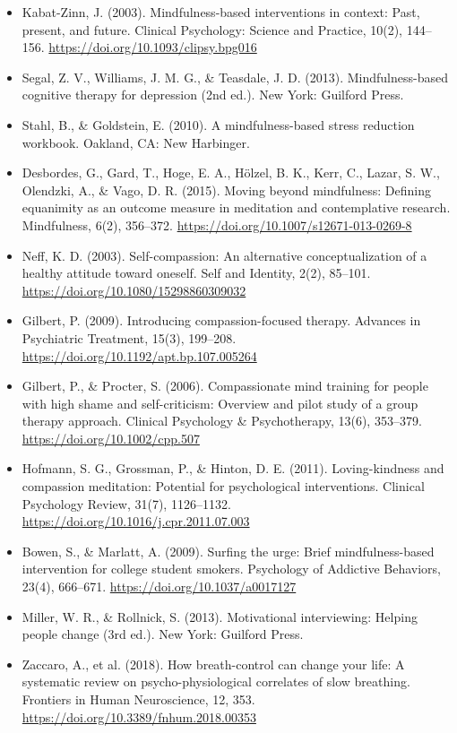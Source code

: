 \documentclass[10pt]{article}
\theoremstyle{remark}
\begin{document}
\begin{itemize}[leftmargin=1em,itemsep=0pt,topsep=1pt,parsep=0pt]
\item Kabat-Zinn, J. (2003). Mindfulness-based interventions in context: Past, present, and future. Clinical Psychology: Science and Practice, 10(2), 144--156. \url{https://doi.org/10.1093/clipsy.bpg016}
\item Segal, Z. V., Williams, J. M. G., \& Teasdale, J. D. (2013). Mindfulness-based cognitive therapy for depression (2nd ed.). New York: Guilford Press.
\item Stahl, B., \& Goldstein, E. (2010). A mindfulness-based stress reduction workbook. Oakland, CA: New Harbinger.
\item Desbordes, G., Gard, T., Hoge, E. A., Hölzel, B. K., Kerr, C., Lazar, S. W., Olendzki, A., \& Vago, D. R. (2015). Moving beyond mindfulness: Defining equanimity as an outcome measure in meditation and contemplative research. Mindfulness, 6(2), 356--372. \url{https://doi.org/10.1007/s12671-013-0269-8}
\item Neff, K. D. (2003). Self-compassion: An alternative conceptualization of a healthy attitude toward oneself. Self and Identity, 2(2), 85--101. \url{https://doi.org/10.1080/15298860309032}
\item Gilbert, P. (2009). Introducing compassion-focused therapy. Advances in Psychiatric Treatment, 15(3), 199--208. \url{https://doi.org/10.1192/apt.bp.107.005264}
\item Gilbert, P., \& Procter, S. (2006). Compassionate mind training for people with high shame and self-criticism: Overview and pilot study of a group therapy approach. Clinical Psychology \& Psychotherapy, 13(6), 353--379. \url{https://doi.org/10.1002/cpp.507}
\item Hofmann, S. G., Grossman, P., \& Hinton, D. E. (2011). Loving-kindness and compassion meditation: Potential for psychological interventions. Clinical Psychology Review, 31(7), 1126--1132. \url{https://doi.org/10.1016/j.cpr.2011.07.003}
\item Bowen, S., \& Marlatt, A. (2009). Surfing the urge: Brief mindfulness-based intervention for college student smokers. Psychology of Addictive Behaviors, 23(4), 666--671. \url{https://doi.org/10.1037/a0017127}
\item Miller, W. R., \& Rollnick, S. (2013). Motivational interviewing: Helping people change (3rd ed.). New York: Guilford Press.
\item Zaccaro, A., et al. (2018). How breath-control can change your life: A systematic review on psycho-physiological correlates of slow breathing. Frontiers in Human Neuroscience, 12, 353. \url{https://doi.org/10.3389/fnhum.2018.00353}
\end{itemize}
\end{document}
